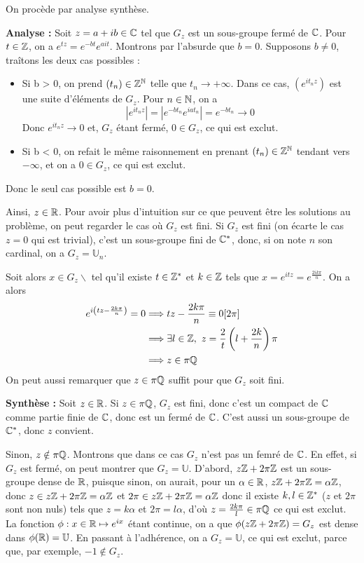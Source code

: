 \begin{sol}
On procède par analyse synthèse.


\textbf{Analyse :} Soit $z=a+ib\in\mathbb{C}$ tel que $G_z$ est un sous-groupe fermé de $\mathbb{C}$. Pour $t\in\mathbb{Z}$, on a $e^{tz}=e^{-bt}e^{ait}$. Montrons par l'absurde que $b=0$. Supposons $b\neq 0$, traîtons les deux cas possibles : 
\begin{itemize}
	\item Si b > 0, on prend $(t_n)\in\mathbb{Z}^{\mathbb{N}}$ telle que $t_n\longrightarrow +\infty$. Dans ce cas, $(e^{it_nz})$ est une suite d'éléments de $G_z$. Pour $n\in\mathbb{N}$, on a \[|e^{it_nz}|=|e^{-bt_n}e^{iat_n}|=e^{-bt_n}\longrightarrow 0\]
	Donc $e^{it_nz}\longrightarrow 0$ et, $G_z$ étant fermé, $0\in G_z$, ce qui est exclut.
	\item Si b < 0, on refait le même raisonnement en prenant $(t_n)\in\mathbb{Z}^{\mathbb{N}}$ tendant vers $-\infty$, et on a $0\in G_z$, ce qui est exclut.
\end{itemize}
Donc le seul cas possible est $b=0$.


Ainsi, $z\in\mathbb{R}$. Pour avoir plus d'intuition sur ce que peuvent être les solutions au problème, on peut regarder le cas où $G_z$ est fini. Si $G_z$ est fini (on écarte le cas $z=0$ qui est trivial), c'est un sous-groupe fini de $\mathbb{C}^*$, donc, si on note $n$ son cardinal, on a $G_z=\mathbb U_n$.

Soit alors $x\in G_z\backslash$ tel qu'il existe $t\in\mathbb{Z}^*$ et $k\in\mathbb{Z}$ tels que $x=e^{itz}=e^{\frac{2ik\pi}n}$. On a alors 
\begin{align*}
	e^{i\left(tz-\frac{2k\pi}n\right)} = 0 &\Longrightarrow tz - \frac{2k\pi}n\equiv 0[2\pi]\\
										   &\Longrightarrow \exists l\in\mathbb{Z},\ z=\frac2t\left(l+\frac{2k}n\right)\pi\\
										   &\Longrightarrow z\in\pi\mathbb{Q}
\end{align*}
On peut aussi remarquer que $z\in\pi\mathbb{Q}$ suffit pour que $G_z$ soit fini. 


\textbf{Synthèse :} Soit $z\in\mathbb{R}$. Si $z\in\pi\mathbb{Q}$, $G_z$ est fini, donc c'est un compact de $\mathbb{C}$ comme partie finie de $\mathbb{C}$, donc est un fermé de $\mathbb{C}$. C'est aussi un sous-groupe de $\mathbb{C}^*$, donc $z$ convient.


Sinon, $z\notin\pi\mathbb{Q}$. Montrons que dans ce cas $G_z$ n'est pas un femré de $\mathbb{C}$. En effet, si $G_z$ est fermé, on peut montrer que $G_z=\mathbb U$. D'abord, $z\mathbb{Z}+2\pi\mathbb{Z}$ est un sous-groupe dense de $\mathbb{R}$, puisque sinon, on aurait, pour un $\alpha\in\mathbb{R}$, $z\mathbb{Z}+2\pi\mathbb{Z}=\alpha\mathbb{Z}$, donc $z\in z\mathbb{Z}+2\pi\mathbb{Z}=\alpha\mathbb{Z}$ et $2\pi\in z\mathbb{Z}+2\pi\mathbb{Z}=\alpha\mathbb{Z}$ donc il existe $k,l\in\mathbb{Z}^*$ ($z$ et $2\pi$ sont non nuls) tels que $z=k\alpha$ et $2\pi=l\alpha$, d'où $z=\frac{2k\pi}l\in\pi\mathbb{Q}$ ce qui est exclut. La fonction $\phi:x\in\mathbb{R}\mapsto e^{ix}$ étant continue, on a que $\phi(z\mathbb{Z}+2\pi\mathbb{Z})=G_z$ est dense dans $\phi(\mathbb{R})=\mathbb U$. En passant à l'adhérence, on a $G_z=\mathbb U$, ce qui est exclut, parce que, par exemple, $-1\notin G_z$.
\end{sol}

